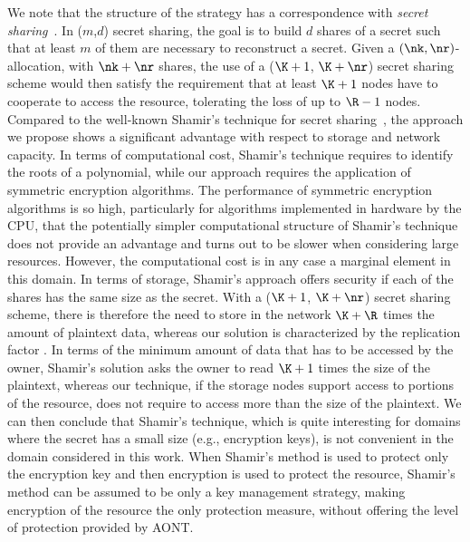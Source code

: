 We note that the structure of the \compact strategy has a
correspondence with {\em secret sharing}~\cite{Shamir:1979:SS:359168.359176}. In
($m$,$d$) secret sharing, the goal is to build $d$ shares of a secret
such that at least $m$ of them are necessary to reconstruct a
secret. Given a \compact $(\nk,\nr)$-allocation, with
$\nk+\nr$ shares, the use of a ($\K+1$, $\K+\nr$) secret sharing
scheme would then satisfy the requirement that at least $\K+1$ nodes
have to cooperate to access the resource, tolerating the loss of up to
$\R-1$ nodes. Compared to the well-known Shamir's technique for secret
sharing~\cite{Shamir:1979:SS:359168.359176}, the approach we propose shows a
significant advantage with respect to storage and network capacity. In
terms of computational cost, Shamir's technique requires to identify
the roots of a polynomial, while our approach requires the application
of symmetric encryption algorithms. The performance of symmetric
encryption algorithms is so high, particularly for algorithms
implemented in hardware by the CPU, that the potentially simpler
computational structure of Shamir's technique does not provide an
advantage and turns out to be slower when considering large
resources. However, the computational cost is in any case a marginal
element in this domain. In terms of storage, Shamir's approach offers
security if each of the shares has the same size as the secret. With a
($\K+1$, $\K+\nr$) secret sharing scheme, there is therefore the need
to store in the network $\K+\R$ times the amount of plaintext data,
whereas our solution is characterized by the replication factor \R.
In terms of the minimum amount of data that has to be accessed by the
owner, Shamir's solution asks the owner to read $\K+1$ times the size
of the plaintext, whereas our technique, if the storage nodes support
access to portions of the resource, does not require to access more
than the size of the plaintext.  We can then conclude that Shamir's
technique, which is quite interesting for domains where the secret has
a small size (e.g., encryption keys), is not convenient in the domain
considered in this work. When Shamir's method is used to protect only
the encryption key and then encryption is used to protect the
resource, Shamir's method can be assumed to be only a key management
strategy, making encryption of the resource the only protection
measure, without offering the level of protection provided by AONT.

